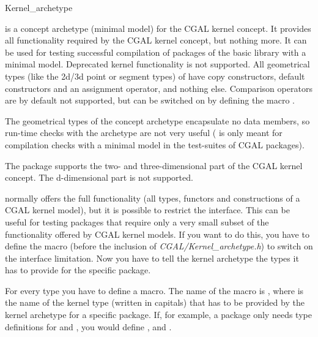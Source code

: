\begin{ccRefClass}{Kernel_archetype}


\ccDefinition

 is a concept archetype (minimal model) for the CGAL kernel concept.
It provides all functionality required by the CGAL kernel concept, but nothing more.
It can be used for testing successful compilation of packages of the basic library with a minimal
model. Deprecated kernel functionality is not supported. All geometrical types (like the 2d/3d point or segment types)
of  have
copy constructors, default constructors and an assignment operator, and nothing else.
Comparison operators are by default not supported, but can be switched on by defining the macro
.

The geometrical types of the concept archetype encapsulate no data members, so run-time checks with the archetype
are not very useful ( is only meant for compilation checks with a minimal model in the test-suites
of CGAL packages).

The package supports the two- and three-dimensional part of the CGAL kernel concept. The d-dimensional
part is not supported.

 normally offers the full functionality (all types, functors and constructions
of a CGAL kernel model), but it is possible to restrict the interface. This can be useful
for testing packages that require only a very small subset of the functionality offered
by CGAL kernel models.
If you want to do this, you have to define the macro  
(before the inclusion of {\em CGAL/Kernel\_archetype.h}) to switch on the interface limitation. 
Now you have to tell the kernel archetype the types it has to provide for the specific package.

For every type you have to define a macro.
The name of the macro is , where  is the name
of the kernel type (written in capitals) that has to be provided by the kernel archetype for a specific package.
If, for example, a package only needs type definitions for  and , you would
define ,  and  .

\ccIsModel
{}


\end{ccRefClass}
